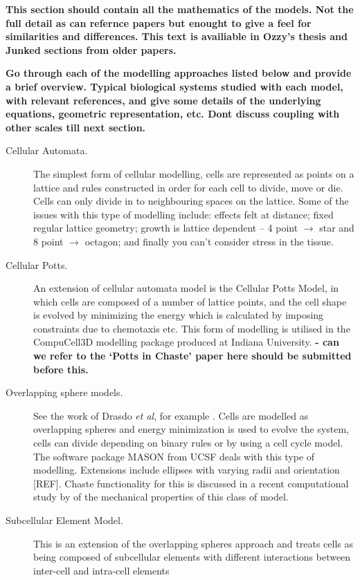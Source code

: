 \documentclass{siamltex}
\newcommand{\highlight}[1]{{\color{red} \bf{#1}}}
\begin{document}
\highlight{This section should contain all the mathematics of the models. Not the full detail as can refernce papers but enought to give a feel for similarities and differences. This text is availiable in Ozzy's thesis and Junked sections from older papers.}


\highlight{Go through each of the modelling approaches listed below and provide a brief overview. 
Typical biological systems studied with each model, with relevant references, and give some details of the underlying equations, geometric representation, etc. Dont discuss coupling with other scales till next section.}

\begin{description}
	\item [Cellular Automata.]
	{The simplest form of cellular modelling, cells are represented as points on a lattice and rules constructed in order for each cell to divide, move or die. 
    Cells can only divide in to neighbouring spaces on the lattice. 
    Some of the issues with this type of modelling include: effects felt at distance; fixed regular lattice geometry; growth is lattice dependent -- 4 point $\rightarrow$ star and 8 point $\rightarrow$ octagon; and finally you can't consider stress in the tissue.}

	\item [Cellular Potts.]
	{An extension of cellular automata model is the Cellular Potts Model, in which cells are composed of a number of lattice points, and the cell shape is evolved by minimizing the energy which is calculated by imposing constraints due to chemotaxis etc. 
	This form of modelling is utilised in the CompuCell3D modelling package produced at Indiana University. 
	\highlight{ - can we refer to the `Potts in Chaste' paper here should be submitted before this.}}

    \item [Overlapping sphere models.]
    {See the work of Drasdo \emph{et al}, for example \citep{Drasdo2007Role}.
    Cells are modelled as overlapping spheres and energy minimization is used to evolve the system, cells can divide depending on binary rules or by using a cell cycle model. 		
    The software package MASON from UCSF deals with this type of modelling. 
    Extensions include ellipses with varying radii and orientation [REF]. 
    Chaste functionality for this is discussed in a recent computational study by \citet{Pathmanathan2009Computational} of the mechanical properties of this class of model.}

    \item [Subcellular Element Model.]
    {This is an extension of the overlapping spheres approach and treats cells as being composed of subcellular elements with different interactions between inter-cell and intra-cell elements \citep{Newman2005Modeling,Sandersius2008Modeling} }


\end{description}
\end{document}
